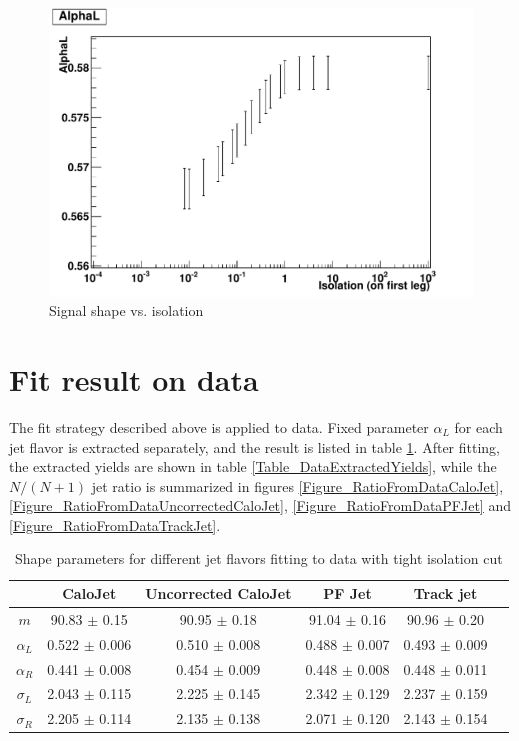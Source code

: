 \documentclass{cmspaper2}
\begin{document}
\begin{figure}[hbtp]
\begin{center}
\includegraphics[width=150mm]{AlphaLVsIsolation_ReasonableIsolation}
\caption{Signal shape vs. isolation}
\label{Figure_SignalShapeVsIsolation}
\end{center}
\end{figure}

\section{Fit result on data}

The fit strategy described above is applied to data.  Fixed parameter $\alpha_L$ for each jet flavor is extracted separately, and the result is listed in table \ref{Table_DataAlphaL}.
After fitting, the extracted yields are shown in table \ref{Table_DataExtractedYields}, while the $N/(N+1)$ jet ratio is summarized in figures \ref{Figure_RatioFromDataCaloJet},
\ref{Figure_RatioFromDataUncorrectedCaloJet}, \ref{Figure_RatioFromDataPFJet} and \ref{Figure_RatioFromDataTrackJet}.

\begin{table}
\caption{Shape parameters for different jet flavors fitting to data with tight isolation cut}
\centering
   \begin{tabular}{|c|c|c|c|c|c|}
      \hline
      & CaloJet & Uncorrected CaloJet & PF Jet & Track jet \\\hline
      $m$ & 90.83 $\pm$ 0.15 & 90.95 $\pm$ 0.18 & 91.04 $\pm$ 0.16 & 90.96 $\pm$ 0.20 \\\hline
      $\alpha_L$ & 0.522 $\pm$ 0.006 & 0.510 $\pm$ 0.008 & 0.488 $\pm$ 0.007 & 0.493 $\pm$ 0.009 \\\hline
      $\alpha_R$ & 0.441 $\pm$ 0.008 & 0.454 $\pm$ 0.009 & 0.448 $\pm$ 0.008 & 0.448 $\pm$ 0.011 \\\hline
      $\sigma_L$ & 2.043 $\pm$ 0.115 & 2.225 $\pm$ 0.145 & 2.342 $\pm$ 0.129 & 2.237 $\pm$ 0.159 \\\hline
      $\sigma_R$ & 2.205 $\pm$ 0.114 & 2.135 $\pm$ 0.138 & 2.071 $\pm$ 0.120 & 2.143 $\pm$ 0.154 \\\hline
   \end{tabular}
   \label{Table_DataAlphaL}
\end{table}
\end{document}

